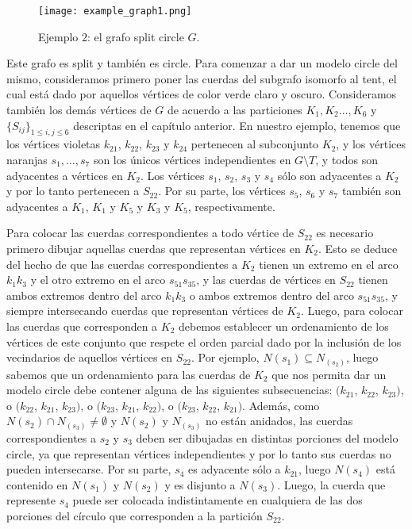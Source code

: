 \documentclass[12pt]{book}
\theoremstyle{plain}
\theoremstyle{remark}
\begin{document}
\begin{figure}[h!] 	\centering
	\texttt{[image: example\_graph1.png]}
	\caption{Ejemplo $2$: el grafo split circle $G$.}
	\label{fig:example_graph1_}
\end{figure}


Este grafo es split y también es circle. Para comenzar a dar un modelo circle del mismo, consideramos primero poner las cuerdas del subgrafo isomorfo al tent, el cual está dado por aquellos vértices de color verde claro y oscuro. Consideramos también los demás vértices de $G$ de acuerdo a las particiones $K_1, K_2 \ldots, K_6$ y $\{ S_{ij} \}_{1 \leq i,j \leq 6}$ descriptas en el capítulo anterior. En nuestro ejemplo, tenemos que los vértices violetas $k_{21}$, $k_{22}$, $k_{23}$ y $k_{24}$ pertenecen al subconjunto $K_2$, y los vértices naranjas $s_1, \ldots, s_7$ son los únicos vértices independientes en $G\setminus T$,  y todos son adyacentes a vértices en $K_2$. Los vértices $s_1$, $s_2$, $s_3$ y $s_4$ sólo son adyacentes a $K_2$ y por lo tanto pertenecen a $S_{22}$. Por su parte, los vértices $s_5$, $s_6$ y $s_7$ también son adyacentes a $K_1$, $K_1$ y $K_5$ y $K_3$ y $K_5$, respectivamente. 
 
Para colocar las cuerdas correspondientes a todo vértice de $S_{22}$ es necesario primero dibujar aquellas cuerdas que representan vértices en $K_2$. Esto se deduce del hecho de que las cuerdas correspondientes a $K_2$ tienen un extremo en el arco $k_1 k_3$ y el otro extremo en el arco $s_{51} s_{35}$, y las cuerdas de vértices en $S_{22}$ tienen ambos extremos dentro del arco $k_1 k_3$ o ambos extremos dentro del arco $s_{51} s_{35}$, y siempre intersecando cuerdas que representan vértices de $K_2$.
Luego, para colocar las cuerdas que corresponden a $K_2$ debemos establecer un ordenamiento de los vértices de este conjunto que respete el orden parcial dado por la inclusión de los vecindarios de aquellos vértices en $S_{22}$. 
Por ejemplo, $N(s_1) \subseteq N_(s_2)$, luego sabemos que un ordenamiento para las cuerdas de $K_2$ que nos permita dar un modelo circle debe contener alguna de las siguientes subsecuencias: $(k_{21}$, $k_{22}$, $k_{23})$, o $(k_{22}$, $k_{21}$, $k_{23})$, o $(k_{23}$, $k_{21}$, $k_{22})$, o $(k_{23}$, $k_{22}$, $k_{21})$. Además, como $N(s_2) \cap N_(s_3) \neq \emptyset$ y $N(s_2)$ y $N_(s_3)$ no están anidados, las cuerdas correspondientes a $s_2$ y $s_3$ deben ser dibujadas en distintas porciones del modelo circle, ya que representan vértices independientes y por lo tanto sus cuerdas no pueden intersecarse. 
Por su parte, $s_4$ es adyacente sólo a $k_{21}$, luego $N(s_4)$ está contenido en $N(s_1)$ y $N(s_2)$ y es disjunto a $N(s_3)$. Luego, la cuerda que represente $s_4$ puede ser colocada indistintamente en cualquiera de las dos porciones del círculo que corresponden a la partición $S_{22}$.
\end{document}
